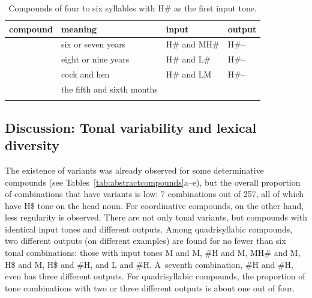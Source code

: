 \begin{subtables}
\begin{table}%
  \caption{Compounds of four to six syllables with H\# as the first input tone.}
  \begin{tabularx}{\textwidth}{ l Q l l }
    \lsptoprule
  	 compound & meaning & input & output\\ \midrule
    & six or seven years & H\# and MH\# & H\#--\\ \addlinespace \hdashline \addlinespace
	 & eight or nine years & H\# and L\# & H\#--\\ \addlinespace \hdashline \addlinespace
	 & cock and hen & H\# and LM & H\#--\\
	 & the fifth and sixth months & &\\
\lspbottomrule
\end{tabularx}
\label{tab:examplesofcoordinativeHpound}
\end{table}
\end{subtables}
  
\clearpage

\subsection{Discussion: Tonal variability and lexical diversity}
\label{sec:discussiontonalvariabilityandsemanticlexicaldiversity}


The existence of variants was already observed for some determinative compounds (see Tables~\ref{tab:abstractcompounds}a--e), but the overall
proportion of combinations that have variants is low: 7 combinations out of 257, all of which have
H\$ tone on the head noun. For coordinative compounds, on the other hand, less regularity is
observed. There are not only tonal variants, but compounds with identical input tones and
different outputs. Among quadrisyllabic compounds, two different outputs (on different examples) are
found for no fewer than six tonal combinations: those with input tones M and M, \#H and M, MH\# and
M, H\$ and M, H\$ and \#H, and L and \#H. A~seventh combination, \#H and \#H, even has three
different outputs. For quadrisyllabic compounds, the proportion of tone combinations with two or
three different outputs is about one out of four.

